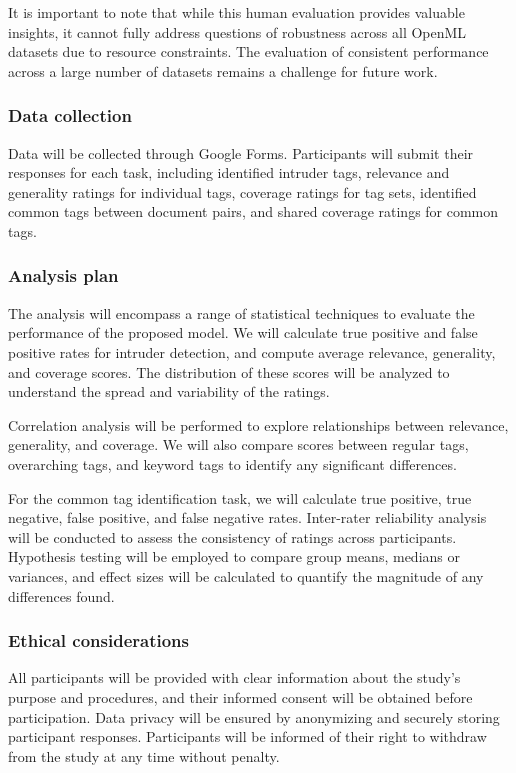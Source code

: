 It is important to note that while this human evaluation provides valuable insights, it cannot fully address questions of robustness across all OpenML datasets due to resource constraints. The evaluation of consistent performance across a large number of datasets remains a challenge for future work.

\subsubsection{Data collection}
Data will be collected through Google Forms. Participants will submit their responses for each task, including identified intruder tags, relevance and generality ratings for individual tags, coverage ratings for tag sets, identified common tags between document pairs, and shared coverage ratings for common tags.

\subsubsection{Analysis plan}
The analysis will encompass a range of statistical techniques to evaluate the performance of the proposed model. We will calculate true positive and false positive rates for intruder detection, and compute average relevance, generality, and coverage scores. The distribution of these scores will be analyzed to understand the spread and variability of the ratings.

Correlation analysis will be performed to explore relationships between relevance, generality, and coverage. We will also compare scores between regular tags, overarching tags, and keyword tags to identify any significant differences.

For the common tag identification task, we will calculate true positive, true negative, false positive, and false negative rates. Inter-rater reliability analysis will be conducted to assess the consistency of ratings across participants. Hypothesis testing will be employed to compare group means, medians or variances, and effect sizes will be calculated to quantify the magnitude of any differences found.

\subsubsection{Ethical considerations}
All participants will be provided with clear information about the study's purpose and procedures, and their informed consent will be obtained before participation. Data privacy will be ensured by anonymizing and securely storing participant responses. Participants will be informed of their right to withdraw from the study at any time without penalty.

